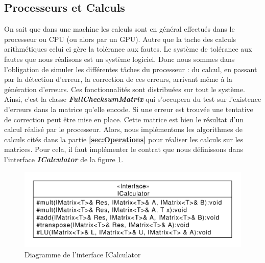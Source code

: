 \documentclass[a4paper, 10pt]{report}
\begin{document}
\subsection{Processeurs et Calculs}
On sait que dans une machine les calculs sont en général effectués dans le processeur ou CPU (ou alors par un GPU).
Autre que la tache des calculs arithmétiques celui ci gère la tolérance aux fautes. Le système de tolérance aux fautes que nous réalisons est un 
système logiciel. Donc nous sommes dans l’obligation de simuler les différentes tâches du processeur : du calcul, 
en passant par la détection d’erreur, la correction de ces erreurs, arrivant même à la génération d’erreurs. Ces 
fonctionnalités sont distribuées sur tout le système. Ainsi, c’est la classe \textbf{\textit{FullChecksumMatrix}} qui 
s’occupera du test sur l’existence d’erreurs dans la matrice qu’elle encode. Si une erreur est trouvée une tentative 
de correction peut être mise en place. Cette matrice est bien le résultat d’un calcul réalisé par le processeur. 
Alors, nous implémentons les algorithmes de calculs cités dans la partie \textbf{\ref{sec:Operations}} pour réaliser les calculs sur 
les matrices. Pour cela, il faut implémenter le contrat que nous définissons dans l’interface \textbf{\textit{ICalculator}} 
de la figure \ref{fig:Diag3}.\newline
\begin{figure}
 \center
 \includegraphics[scale=0.35]{ICalculator.pdf}
 \caption{Diagramme de l'interface ICalculator}
  \label{fig:Diag3}
\end{figure}
\end{document}
